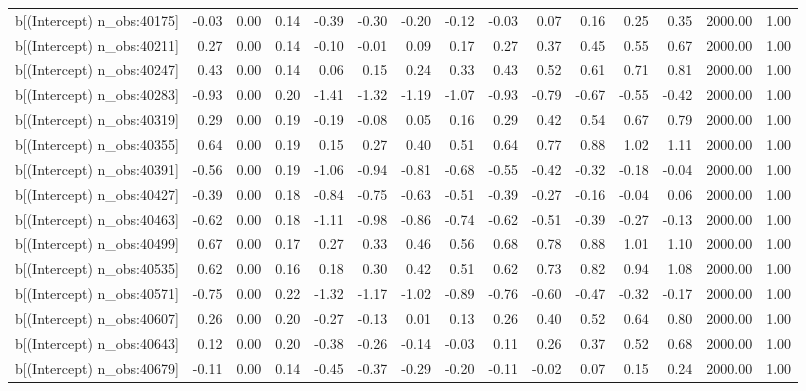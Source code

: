\begin{table}[ht]
\begin{tabular}{rrrrrrrrrrrrrrr}
  b[(Intercept) n\_obs:40175] & -0.03 & 0.00 & 0.14 & -0.39 & -0.30 & -0.20 & -0.12 & -0.03 & 0.07 & 0.16 & 0.25 & 0.35 & 2000.00 & 1.00 \\ 
  b[(Intercept) n\_obs:40211] & 0.27 & 0.00 & 0.14 & -0.10 & -0.01 & 0.09 & 0.17 & 0.27 & 0.37 & 0.45 & 0.55 & 0.67 & 2000.00 & 1.00 \\ 
  b[(Intercept) n\_obs:40247] & 0.43 & 0.00 & 0.14 & 0.06 & 0.15 & 0.24 & 0.33 & 0.43 & 0.52 & 0.61 & 0.71 & 0.81 & 2000.00 & 1.00 \\ 
  b[(Intercept) n\_obs:40283] & -0.93 & 0.00 & 0.20 & -1.41 & -1.32 & -1.19 & -1.07 & -0.93 & -0.79 & -0.67 & -0.55 & -0.42 & 2000.00 & 1.00 \\ 
  b[(Intercept) n\_obs:40319] & 0.29 & 0.00 & 0.19 & -0.19 & -0.08 & 0.05 & 0.16 & 0.29 & 0.42 & 0.54 & 0.67 & 0.79 & 2000.00 & 1.00 \\ 
  b[(Intercept) n\_obs:40355] & 0.64 & 0.00 & 0.19 & 0.15 & 0.27 & 0.40 & 0.51 & 0.64 & 0.77 & 0.88 & 1.02 & 1.11 & 2000.00 & 1.00 \\ 
  b[(Intercept) n\_obs:40391] & -0.56 & 0.00 & 0.19 & -1.06 & -0.94 & -0.81 & -0.68 & -0.55 & -0.42 & -0.32 & -0.18 & -0.04 & 2000.00 & 1.00 \\ 
  b[(Intercept) n\_obs:40427] & -0.39 & 0.00 & 0.18 & -0.84 & -0.75 & -0.63 & -0.51 & -0.39 & -0.27 & -0.16 & -0.04 & 0.06 & 2000.00 & 1.00 \\ 
  b[(Intercept) n\_obs:40463] & -0.62 & 0.00 & 0.18 & -1.11 & -0.98 & -0.86 & -0.74 & -0.62 & -0.51 & -0.39 & -0.27 & -0.13 & 2000.00 & 1.00 \\ 
  b[(Intercept) n\_obs:40499] & 0.67 & 0.00 & 0.17 & 0.27 & 0.33 & 0.46 & 0.56 & 0.68 & 0.78 & 0.88 & 1.01 & 1.10 & 2000.00 & 1.00 \\ 
  b[(Intercept) n\_obs:40535] & 0.62 & 0.00 & 0.16 & 0.18 & 0.30 & 0.42 & 0.51 & 0.62 & 0.73 & 0.82 & 0.94 & 1.08 & 2000.00 & 1.00 \\ 
  b[(Intercept) n\_obs:40571] & -0.75 & 0.00 & 0.22 & -1.32 & -1.17 & -1.02 & -0.89 & -0.76 & -0.60 & -0.47 & -0.32 & -0.17 & 2000.00 & 1.00 \\ 
  b[(Intercept) n\_obs:40607] & 0.26 & 0.00 & 0.20 & -0.27 & -0.13 & 0.01 & 0.13 & 0.26 & 0.40 & 0.52 & 0.64 & 0.80 & 2000.00 & 1.00 \\ 
  b[(Intercept) n\_obs:40643] & 0.12 & 0.00 & 0.20 & -0.38 & -0.26 & -0.14 & -0.03 & 0.11 & 0.26 & 0.37 & 0.52 & 0.68 & 2000.00 & 1.00 \\ 
  b[(Intercept) n\_obs:40679] & -0.11 & 0.00 & 0.14 & -0.45 & -0.37 & -0.29 & -0.20 & -0.11 & -0.02 & 0.07 & 0.15 & 0.24 & 2000.00 & 1.00 \\ 

\end{tabular}
\end{table}
